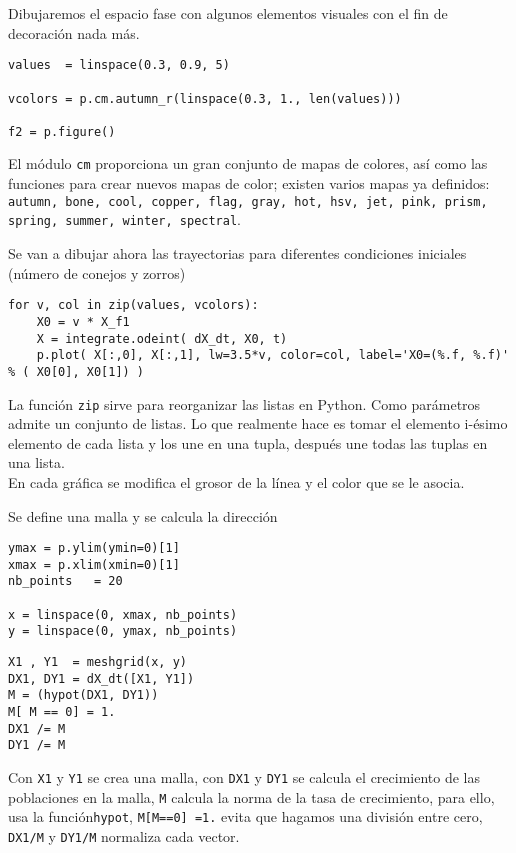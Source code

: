 \begin{frame}[fragile]
Dibujaremos el espacio fase con algunos elementos visuales con el fin de decoración nada más.
\begin{lstlisting}
values  = linspace(0.3, 0.9, 5)                         

vcolors = p.cm.autumn_r(linspace(0.3, 1., len(values)))  

f2 = p.figure()
\end{lstlisting}
El módulo \texttt{cm} proporciona un gran conjunto de mapas de colores, así como las funciones para crear nuevos mapas de color; existen varios mapas ya definidos: \texttt{autumn, bone, cool, copper, flag, gray, hot, hsv, jet, pink, prism, spring, summer, winter, spectral}.
\end{frame}
\begin{frame}[fragile]
Se van a dibujar ahora las trayectorias para diferentes condiciones iniciales (número de conejos y zorros)
\begin{lstlisting}
for v, col in zip(values, vcolors):
    X0 = v * X_f1
    X = integrate.odeint( dX_dt, X0, t)
    p.plot( X[:,0], X[:,1], lw=3.5*v, color=col, label='X0=(%.f, %.f)' % ( X0[0], X0[1]) )
\end{lstlisting}
La función \texttt{zip} sirve para reorganizar las listas en Python. Como parámetros admite un conjunto de listas. Lo que realmente hace es tomar el elemento i-ésimo elemento de cada lista y los une en una tupla, después une todas las tuplas en una lista.
\\
\medskip
En cada gráfica se modifica el grosor de la línea y el color que se le asocia.
\end{frame}
\begin{frame}[fragile]
Se define una malla y se calcula la dirección
\begin{lstlisting}
ymax = p.ylim(ymin=0)[1]                        
xmax = p.xlim(xmin=0)[1]
nb_points   = 20
 
x = linspace(0, xmax, nb_points)
y = linspace(0, ymax, nb_points)
\end{lstlisting}
\end{frame}
\begin{frame}[fragile]
\begin{lstlisting}
X1 , Y1  = meshgrid(x, y)                       
DX1, DY1 = dX_dt([X1, Y1])                      
M = (hypot(DX1, DY1))                           
M[ M == 0] = 1.                                 
DX1 /= M                                        
DY1 /= M
\end{lstlisting}
Con \texttt{X1} y \texttt{Y1} se crea una malla, con \texttt{DX1} y \texttt{DY1} se calcula el crecimiento de las poblaciones en la malla, \texttt{M} calcula la norma de la tasa de crecimiento, para ello, usa la función\texttt{hypot}, \texttt{M[M==0] =1.} evita que hagamos una división entre cero, \texttt{DX1/M} y \texttt{DY1/M} normaliza cada vector.
\end{frame}
